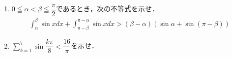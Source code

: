 \documentclass[../../main.tex]{subfiles}
\begin{document}
\begin{enumerate}
  \item $\displaystyle0\leqq\alpha<\beta\leqq\dfrac{\pi}{2}$であるとき，次の不等式を示せ．
    \begin{align*}
      \int_\alpha^\beta \sin xdx + \int_{\pi-\beta}^{\pi-\alpha} \sin xdx >
      (\beta-\alpha)(\sin\alpha+\sin(\pi-\beta))
    \end{align*}
  \item $\displaystyle\sum_{k=1}^7\sin\dfrac{k\pi}{8}<\dfrac{16}{\pi}$を示せ．
\end{enumerate}
\end{document}
